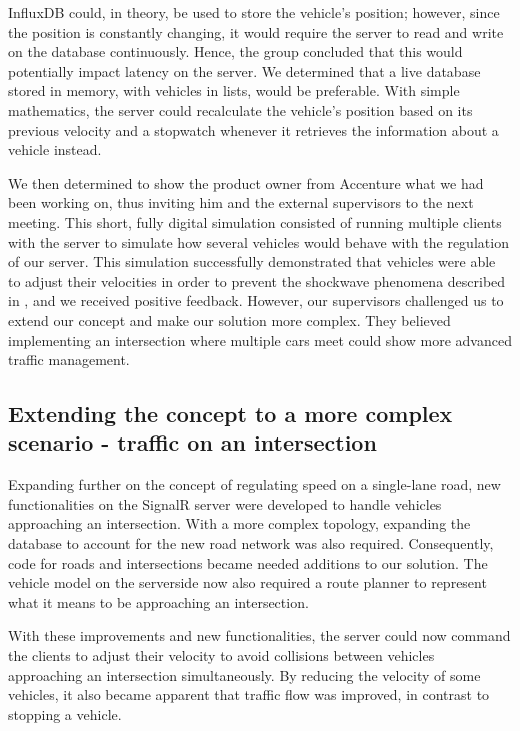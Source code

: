 InfluxDB could, in theory, be used to store the vehicle's position; however, since the position is constantly changing, it would require the server to read and write on the database continuously. Hence, the group concluded that this would potentially impact latency on the server. We determined that a live database stored in memory, with vehicles in lists, would be preferable. With simple mathematics, the server could recalculate the vehicle's position based on its previous velocity and a stopwatch whenever it retrieves the information about a vehicle instead.

We then determined to show the product owner from Accenture what we had been working on, thus inviting him and the external supervisors to the next meeting. This short, fully digital simulation consisted of running multiple clients with the server to simulate how several vehicles would behave with the regulation of our server. This simulation successfully demonstrated that vehicles were able to adjust their velocities in order to prevent the shockwave phenomena described in , and we received positive feedback. However, our supervisors challenged us to extend our concept and make our solution more complex. They believed implementing an intersection where multiple cars meet could show more advanced traffic management.

\subsection{Extending the concept to a more complex scenario - traffic on an intersection}
Expanding further on the concept of regulating speed on a single-lane road, new functionalities on the SignalR server were developed to handle vehicles approaching an intersection. With a more complex topology, expanding the database to account for the new road network was also required. Consequently, code for roads and intersections became needed additions to our solution. The vehicle model on the serverside now also required a route planner to represent what it means to be approaching an intersection.

With these improvements and new functionalities, the server could now command the clients to adjust their velocity to avoid collisions between vehicles approaching an intersection simultaneously. By reducing the velocity of some vehicles, it also became apparent that traffic flow was improved, in contrast to stopping a vehicle.